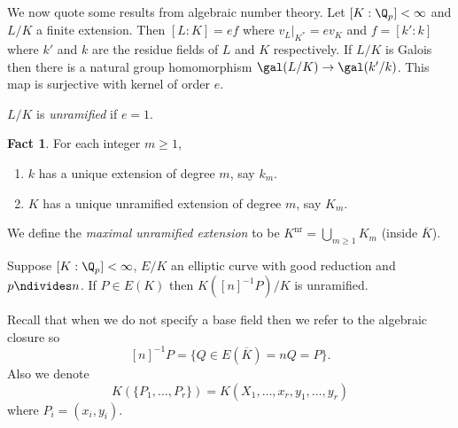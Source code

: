 \documentclass[a4paper]{article}
\theoremstyle{definition}
\newtheorem*{fact}{Fact}
\begin{document}
We now quote some results from algebraic number theory. Let \([K: \Q_p] < \infty\) and \(L/K\) a finite extension. Then \([L: K] = ef\) where \(v_L|_{K^*} = e v_K\) and \(f = [k': k]\) where \(k'\) and \(k\) are the residue fields of \(L\) and \(K\) respectively. If \(L/K\) is Galois then there is a natural group homomorphism \(\gal(L/K) \to \gal(k'/k)\). This map is surjective with kernel of order \(e\).

\begin{definition}
  \(L/K\) is \emph{unramified} if \(e = 1\).
\end{definition}

\begin{fact}
  For each integer \(m \geq 1\),
  \begin{enumerate}
  \item \(k\) has a unique extension of degree \(m\), say \(k_m\).
  \item \(K\) has a unique unramified extension of degree \(m\), say \(K_m\).
  \end{enumerate}
\end{fact}

\begin{definition}
  We define the \emph{maximal unramified extension} to be \(K^{\mathrm{nr}} = \bigcup_{m \geq 1} K_m\) (inside \(\overline K\)).
\end{definition}

\begin{theorem}
  Suppose \([K: \Q_p] < \infty\), \(E/K\) an elliptic curve with good reduction and \(p \ndivides n\). If \(P \in E(K)\) then \(K([n]^{-1}P)/K\) is unramified.
\end{theorem}

Recall that when we do not specify a base field then we refer to the algebraic closure so
\[
  [n]^{-1}P = \{Q \in E(\overline K) = nQ = P\}.
\]
Also we denote
\[
  K(\{P_1, \dots, P_r\}) = K(X_1, \dots, x_r, y_1, \dots, y_r)
\]
where \(P_i = (x_i, y_i)\).
\end{document}
